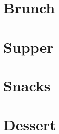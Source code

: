 \documentclass{recipe}
\begin{document}
\tableofcontents



\chapter{Brunch}




\chapter{Supper}


\chapter{Snacks}

\chapter{Dessert}
\end{document}
